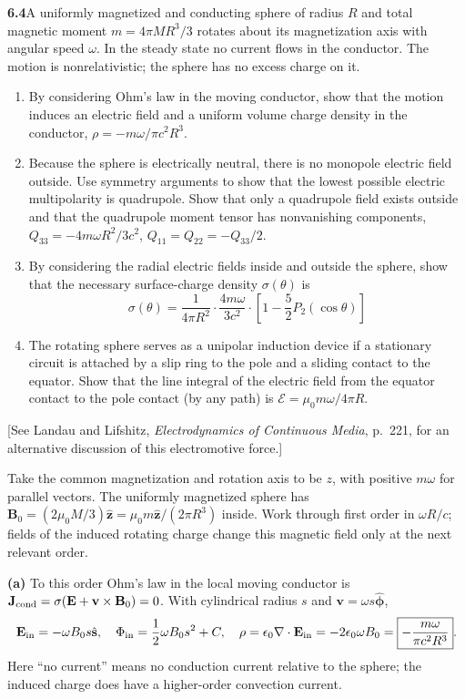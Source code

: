 \par\bigskip
\noindent\textbf{6.4}\quad A uniformly magnetized and conducting sphere of radius $R$ and total magnetic moment $m=4\pi MR^{3}/3$ rotates about its magnetization axis with angular speed $\omega$. In the steady state no current flows in the conductor. The motion is nonrelativistic; the sphere has no excess charge on it.
\begin{enumerate}
\item[(a)] By considering Ohm's law in the moving conductor, show that the motion induces an electric field and a uniform volume charge density in the conductor, $\rho=-m\omega/\pi c^{2}R^{3}$.
\item[(b)] Because the sphere is electrically neutral, there is no monopole electric field outside. Use symmetry arguments to show that the lowest possible electric multipolarity is quadrupole. Show that only a quadrupole field exists outside and that the quadrupole moment tensor has nonvanishing components, $Q_{33}=-4m\omega R^{2}/3c^{2}$, $Q_{11}=Q_{22}=-Q_{33}/2$.
\item[(c)] By considering the radial electric fields inside and outside the sphere, show that the necessary surface-charge density $\sigma(\theta)$ is
\[
\sigma(\theta)=\frac{1}{4\pi R^{2}}\cdot\frac{4m\omega}{3c^{2}}\cdot\left[1-\frac{5}{2}P_{2}(\cos\theta)\right]
\]
\item[(d)] The rotating sphere serves as a unipolar induction device if a stationary circuit is attached by a slip ring to the pole and a sliding contact to the equator. Show that the line integral of the electric field from the equator contact to the pole contact (by any path) is $\mathcal{E}=\mu_{0}m\omega/4\pi R$.
\end{enumerate}
[See Landau and Lifshitz, \emph{Electrodynamics of Continuous Media}, p.~221, for an alternative discussion of this electromotive force.]
\solution

Take the common magnetization and rotation axis to be $z$, with positive
$m\omega$ for parallel vectors. The uniformly magnetized sphere has
$\mathbf B_0=(2\mu_0M/3)\hat{\mathbf z}
=\mu_0m\hat{\mathbf z}/(2\pi R^3)$ inside. Work through first order in
$\omega R/c$; fields of the induced rotating charge change this magnetic
field only at the next relevant order.

\textbf{(a)} To this order Ohm's law in the local moving conductor is
$\mathbf J_{\rm cond}=\sigma(\mathbf E+\mathbf v\times\mathbf B_0)=0$.
With cylindrical radius $s$ and $\mathbf v=\omega s\hat{\boldsymbol\phi}$,
\[
\mathbf E_{\rm in}=-\omega B_0s\hat{\mathbf s},\quad
\Phi_{\rm in}=\frac12\omega B_0s^2+C,\quad
\rho=\epsilon_0\nabla\cdot\mathbf E_{\rm in}
=-2\epsilon_0\omega B_0
=\boxed{-\frac{m\omega}{\pi c^2R^3}}.
\]
Here ``no current'' means no conduction current relative to the sphere;
the induced charge does have a higher-order convection current.

